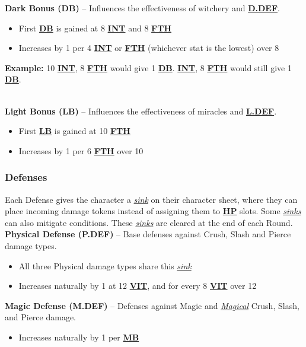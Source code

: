 \documentclass[12pt]{article}
\newcommand{\refto}[1]{\hyperlink{#1}{\textbf{#1}}}
\newcommand{\makeref}[1]{\hypertarget{#1}{\textbf{#1}}}
\newcommand{\reftoit}[1]{\hyperlink{#1}{\emph{#1}}}
\begin{document}
\begin{multicols*}{2}
\textbf{Dark Bonus (\makeref{DB})} – Influences the effectiveness of witchery and \refto{D.DEF}.
\begin{itemize}
\item First \refto{DB} is gained at 8 \refto{INT} and 8 \refto{FTH}
\item Increases by 1 per 4 \refto{INT} or \refto{FTH} (whichever stat is the lowest) over 8
\end{itemize}
\begin{tcolorbox}
\textbf{Example:} 10 \refto{INT}, 8 \refto{FTH} would give 1 \refto{DB}. \refto{INT}, 8 \refto{FTH} would still give 1 \refto{DB}.
\end{tcolorbox}
\ \\
\textbf{Light Bonus (\makeref{LB})} – Influences the effectiveness of miracles and \refto{L.DEF}.
\begin{itemize}
\item First \refto{LB} is gained at 10 \refto{FTH}
\item Increases by 1 per 6 \refto{FTH} over 10
\end{itemize}

\vspace*{\fill}
\columnbreak

\subsubsection{Defenses}
Each Defense gives the character a \reftoit{sink} on their character sheet, where they can place incoming damage tokens instead of assigning them to \refto{HP} slots. Some \reftoit{sinks} can also mitigate conditions. These \reftoit{sinks} are cleared at the end of each Round.\\

\textbf{Physical Defense (\makeref{P.DEF})} – Base defenses against Crush, Slash and Pierce damage types.
\begin{itemize}
\item All three Physical damage types share this \reftoit{sink}
\item Increases naturally by 1 at 12 \refto{VIT}, and for every 8 \refto{VIT} over 12
\end{itemize}

\textbf{Magic Defense (\makeref{M.DEF})} – Defenses against Magic and \reftoit{Magical} Crush, Slash, and Pierce damage.
\begin{itemize}
\item Increases naturally by 1 per \refto{MB}
\end{itemize}


\end{multicols*}
\end{document}

